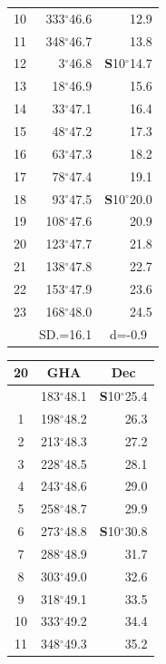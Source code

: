 \documentclass[10pt, a4paper]{report}
\begin{document}
\begin{scriptsize}
\begin{tabular*}{0.2\textwidth}[t]{@{\extracolsep{\fill}}|c|rr|}
10 & 333$^\circ$46.6 & 12.9\\
11 & 348$^\circ$46.7 & 13.8\\[2Pt]
12 & 3$^\circ$46.8 & \textbf{S}10$^\circ$14.7\\
13 & 18$^\circ$46.9 & 15.6\\
14 & 33$^\circ$47.1 & 16.4\\
15 & 48$^\circ$47.2 & \raisebox{0.24ex}{\boldmath$\cdot$~\boldmath$\cdot$~~}17.3\\
16 & 63$^\circ$47.3 & 18.2\\
17 & 78$^\circ$47.4 & 19.1\\[2Pt]
18 & 93$^\circ$47.5 & \textbf{S}10$^\circ$20.0\\
19 & 108$^\circ$47.6 & 20.9\\
20 & 123$^\circ$47.7 & 21.8\\
21 & 138$^\circ$47.8 & \raisebox{0.24ex}{\boldmath$\cdot$~\boldmath$\cdot$~~}22.7\\
22 & 153$^\circ$47.9 & 23.6\\
23 & 168$^\circ$48.0 & 24.5\\
\hline
\rule{0pt}{2.4ex} & \multicolumn{1}{c}{SD.=16.1} & \multicolumn{1}{c|}{d=-0.9}\\
\hline
\end{tabular*}\noindent
\begin{tabular*}{0.2\textwidth}[t]{@{\extracolsep{\fill}}|c|rr|}
\hline
\multicolumn{1}{|c|}{\rule{0pt}{2.6ex}\textbf{20}} & \multicolumn{1}{c}{\textbf{GHA}} & \multicolumn{1}{c|}{\textbf{Dec}}\\
\hline\rule{0pt}{2.6ex}\noindent
0 & 183$^\circ$48.1 & \textbf{S}10$^\circ$25.4\\
1 & 198$^\circ$48.2 & 26.3\\
2 & 213$^\circ$48.3 & 27.2\\
3 & 228$^\circ$48.5 & \raisebox{0.24ex}{\boldmath$\cdot$~\boldmath$\cdot$~~}28.1\\
4 & 243$^\circ$48.6 & 29.0\\
5 & 258$^\circ$48.7 & 29.9\\[2Pt]
6 & 273$^\circ$48.8 & \textbf{S}10$^\circ$30.8\\
7 & 288$^\circ$48.9 & 31.7\\
8 & 303$^\circ$49.0 & 32.6\\
9 & 318$^\circ$49.1 & \raisebox{0.24ex}{\boldmath$\cdot$~\boldmath$\cdot$~~}33.5\\
10 & 333$^\circ$49.2 & 34.4\\
11 & 348$^\circ$49.3 & 35.2\\[2Pt]

\end{tabular*}
\end{scriptsize}
\end{document}
